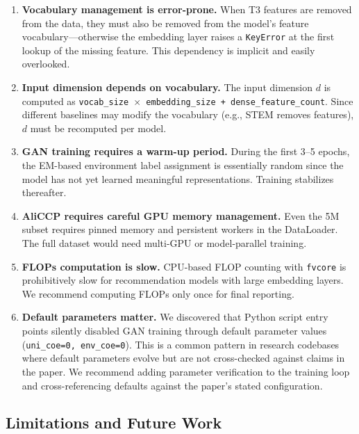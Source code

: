 \documentclass[review,anonymous]{acmart}
\begin{document}
\begin{enumerate}
  \item \textbf{Vocabulary management is error-prone.} When T3 features are
    removed from the data, they must also be removed from the model's feature
    vocabulary---otherwise the embedding layer raises a \texttt{KeyError} at
    the first lookup of the missing feature. This dependency is implicit and
    easily overlooked.

  \item \textbf{Input dimension depends on vocabulary.} The input dimension $d$
    is computed as \texttt{vocab\_size $\times$ embedding\_size +
    dense\_feature\_count}. Since different baselines may modify the vocabulary
    (e.g., STEM removes features), $d$ must be recomputed per model.

  \item \textbf{GAN training requires a warm-up period.} During the first
    3--5 epochs, the EM-based environment label assignment is essentially random
    since the model has not yet learned meaningful representations. Training
    stabilizes thereafter.

  \item \textbf{AliCCP requires careful GPU memory management.} Even the 5M
    subset requires pinned memory and persistent workers in the DataLoader.
    The full dataset would need multi-GPU or model-parallel training.

  \item \textbf{FLOPs computation is slow.} CPU-based FLOP counting with
    \texttt{fvcore} is prohibitively slow for recommendation models with large
    embedding layers. We recommend computing FLOPs only once for final reporting.

  \item \textbf{Default parameters matter.} We discovered that Python script
    entry points silently disabled GAN training through default parameter
    values (\texttt{uni\_coe=0, env\_coe=0}). This is a common pattern in
    research codebases where default parameters evolve but are not
    cross-checked against claims in the paper. We recommend adding parameter
    verification to the training loop and cross-referencing defaults against
    the paper's stated configuration.
\end{enumerate}

\subsection{Limitations and Future Work}
\end{document}
